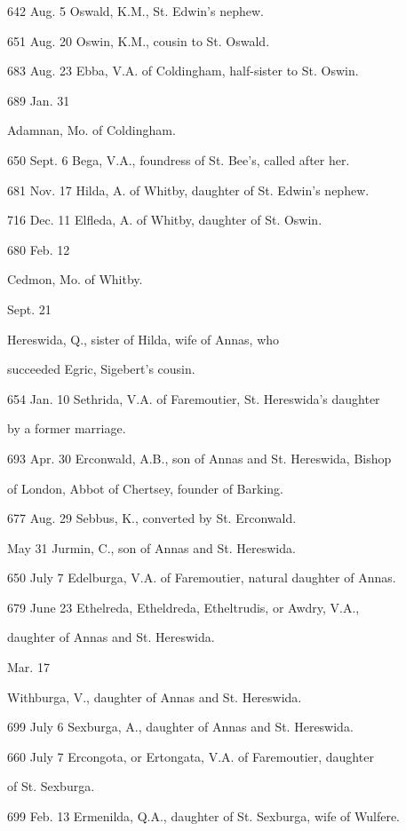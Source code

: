 642 Aug.
5
Oswald, K.M., St. Edwin's nephew.

651 Aug.
20
Oswin, K.M., cousin to St. Oswald.

683 Aug.
23
Ebba, V.A. of Coldingham, half-sister to St. Oswin.

689 Jan.
31

Adamnan, Mo. of Coldingham.


650 Sept.
6
Bega,
V.A., foundress of St. Bee's, called after her.

681 Nov.
17
Hilda, A. of Whitby, daughter of St. Edwin's nephew.

716 Dec.
11
Elfleda, A. of Whitby, daughter of St. Oswin.

680 Feb.
12

Cedmon, Mo. of Whitby.


Sept. 21

Hereswida, Q., sister of Hilda, wife of Annas, who

succeeded Egric, Sigebert's cousin.

654
Jan. 10
Sethrida, V.A. of Faremoutier, St. Hereswida's daughter

by a
former marriage.

693
Apr. 30
Erconwald, A.B., son of Annas and St. Hereswida, Bishop

of
London, Abbot of Chertsey, founder of Barking.

677
Aug. 29
Sebbus, K., converted by St. Erconwald.

May 31
Jurmin, C., son of Annas and St. Hereswida.

650
July 7
Edelburga, V.A. of Faremoutier, natural daughter of Annas.

679
June 23
Ethelreda, Etheldreda, Etheltrudis, or Awdry, V.A.,

daughter
of Annas and St. Hereswida.

Mar. 17

Withburga, V., daughter of Annas and St. Hereswida.

699
July 6
Sexburga, A., daughter of Annas and St. Hereswida.

660
July 7
Ercongota, or Ertongata, V.A. of Faremoutier, daughter

of St.
Sexburga.

699
Feb. 13
Ermenilda, Q.A., daughter of St. Sexburga, wife of Wulfere.

